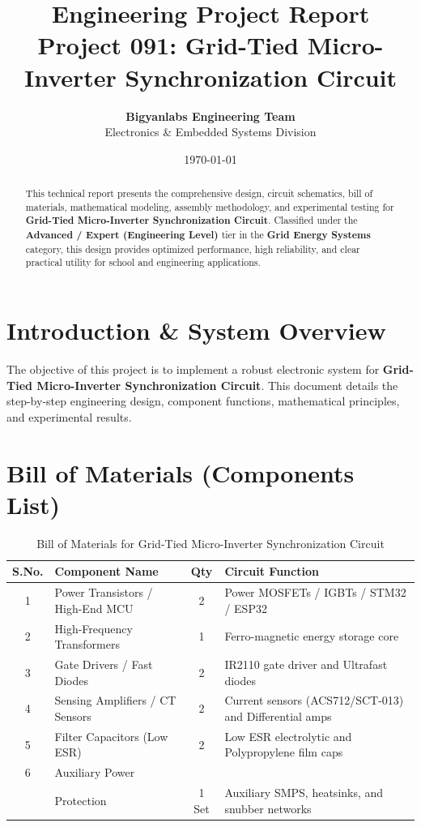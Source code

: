 \documentclass[11pt,a4paper]{article}
\title{\textbf{\Huge Engineering Project Report}\\[0.5em] \Large Project 091: Grid-Tied Micro-Inverter Synchronization Circuit}
\author{\textbf{Bigyanlabs Engineering Team}\\ Electronics \& Embedded Systems Division}
\date{\today}
\begin{document}
\maketitle
\thispagestyle{empty}

\begin{abstract}
This technical report presents the comprehensive design, circuit schematics, bill of materials, mathematical modeling, assembly methodology, and experimental testing for \textbf{Grid-Tied Micro-Inverter Synchronization Circuit}. Classified under the \textbf{Advanced / Expert (Engineering Level)} tier in the \textbf{Grid Energy Systems} category, this design provides optimized performance, high reliability, and clear practical utility for school and engineering applications.
\end{abstract}

\newpage
\tableofcontents
\newpage

\section{Introduction \& System Overview}
The objective of this project is to implement a robust electronic system for \textbf{Grid-Tied Micro-Inverter Synchronization Circuit}. This document details the step-by-step engineering design, component functions, mathematical principles, and experimental results.

\section{Bill of Materials (Components List)}
\begin{table}[h!]
\centering
\caption{Bill of Materials for Grid-Tied Micro-Inverter Synchronization Circuit}
\vspace{0.5em}
\begin{tabular}{clcp{7cm}}
\toprule
\textbf{S.No.} & \textbf{Component Name} & \textbf{Qty} & \textbf{Circuit Function} \\
\midrule
1 & Power Transistors / High-End MCU & 2 & Power MOSFETs / IGBTs / STM32 / ESP32 \\
2 & High-Frequency Transformers & 1 & Ferro-magnetic energy storage core \\
3 & Gate Drivers / Fast Diodes & 2 & IR2110 gate driver and Ultrafast diodes \\
4 & Sensing Amplifiers / CT Sensors & 2 & Current sensors (ACS712/SCT-013) and Differential amps \\
5 & Filter Capacitors (Low ESR) & 2 & Low ESR electrolytic and Polypropylene film caps \\
6 & Auxiliary Power \\& Protection & 1 Set & Auxiliary SMPS, heatsinks, and snubber networks \\
\bottomrule
\end{tabular}
\end{table}
\end{document}
